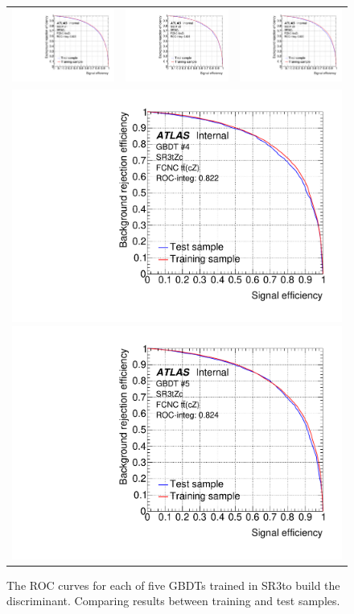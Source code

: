 \begin{figure}[htbp]
	\centering
	\begin{tabular}{ccc}
		\includegraphics[width=.3\textwidth]{Chapters/CH6/figures/SR3_UsingSMT/BDT/ROC_Fold1} &
		\includegraphics[width=.3\textwidth]{Chapters/CH6/figures/SR3_UsingSMT/BDT/ROC_Fold2} &
		\includegraphics[width=.3\textwidth]{Chapters/CH6/figures/SR3_UsingSMT/BDT/ROC_Fold3} \\ 
		\multicolumn{3}{c}{
			\includegraphics[width=.3\textwidth]{Chapters/CH6/figures/SR3_UsingSMT/BDT/ROC_Fold4}
			\includegraphics[width=.3\textwidth]{Chapters/CH6/figures/SR3_UsingSMT/BDT/ROC_Fold5}} \\
	\end{tabular}
	\caption{ The ROC curves for each of five GBDTs trained in SR3\tZc to build the \Dthree discriminant. 
		Comparing results between training and test samples.
	}%
	\label{fig:separation:SR3:ROC}
\end{figure}

